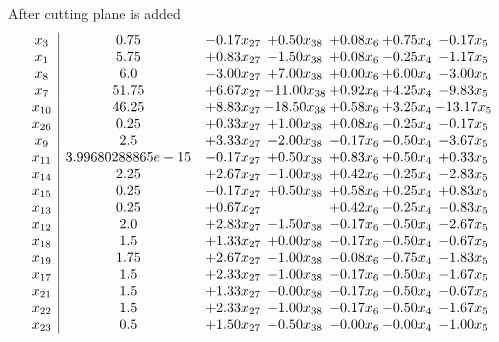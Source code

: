 \documentclass[8pt]{article}
\begin{document}
 After cutting plane is added 
\[\begin{array}{c| c c@{\hskip 2pt} c@{\hskip 2pt} c@{\hskip 2pt} c@{\hskip 2pt} c@{\hskip 2pt} }
 x_{3}   &  0.75 & -0.17 x_{27} & +  0.50 x_{38} & +  0.08 x_{6} & +  0.75 x_{4} & -0.17 x_{5}\\
 x_{1}   &  5.75 & +  0.83 x_{27} & -1.50 x_{38} & +  0.08 x_{6} & -0.25 x_{4} & -1.17 x_{5}\\
 x_{8}   &  6.0 & -3.00 x_{27} & +  7.00 x_{38} & +  0.00 x_{6} & +  6.00 x_{4} & -3.00 x_{5}\\
 x_{7}   &  51.75 & +  6.67 x_{27} & -11.00 x_{38} & +  0.92 x_{6} & +  4.25 x_{4} & -9.83 x_{5}\\
 x_{10}   &  46.25 & +  8.83 x_{27} & -18.50 x_{38} & +  0.58 x_{6} & +  3.25 x_{4} & -13.17 x_{5}\\
 x_{26}   &  0.25 & +  0.33 x_{27} & +  1.00 x_{38} & +  0.08 x_{6} & -0.25 x_{4} & -0.17 x_{5}\\
 x_{9}   &  2.5 & +  3.33 x_{27} & -2.00 x_{38} & -0.17 x_{6} & -0.50 x_{4} & -3.67 x_{5}\\
 x_{11}   &  3.99680288865e-15 & -0.17 x_{27} & +  0.50 x_{38} & +  0.83 x_{6} & +  0.50 x_{4} & +  0.33 x_{5}\\
 x_{14}   &  2.25 & +  2.67 x_{27} & -1.00 x_{38} & +  0.42 x_{6} & -0.25 x_{4} & -2.83 x_{5}\\
 x_{15}   &  0.25 & -0.17 x_{27} & +  0.50 x_{38} & +  0.58 x_{6} & +  0.25 x_{4} & +  0.83 x_{5}\\
 x_{13}   &  0.25 & +  0.67 x_{27} &   & +  0.42 x_{6} & -0.25 x_{4} & -0.83 x_{5}\\
 x_{12}   &  2.0 & +  2.83 x_{27} & -1.50 x_{38} & -0.17 x_{6} & -0.50 x_{4} & -2.67 x_{5}\\
 x_{18}   &  1.5 & +  1.33 x_{27} & +  0.00 x_{38} & -0.17 x_{6} & -0.50 x_{4} & -0.67 x_{5}\\
 x_{19}   &  1.75 & +  2.67 x_{27} & -1.00 x_{38} & -0.08 x_{6} & -0.75 x_{4} & -1.83 x_{5}\\
 x_{17}   &  1.5 & +  2.33 x_{27} & -1.00 x_{38} & -0.17 x_{6} & -0.50 x_{4} & -1.67 x_{5}\\
 x_{21}   &  1.5 & +  1.33 x_{27} & -0.00 x_{38} & -0.17 x_{6} & -0.50 x_{4} & -0.67 x_{5}\\
 x_{22}   &  1.5 & +  2.33 x_{27} & -1.00 x_{38} & -0.17 x_{6} & -0.50 x_{4} & -1.67 x_{5}\\
 x_{23}   &  0.5 & +  1.50 x_{27} & -0.50 x_{38} & -0.00 x_{6} & -0.00 x_{4} & -1.00 x_{5}\\

\end{array}\]
\end{document}
